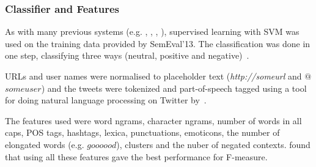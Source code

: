 \subsubsection{Classifier and Features}

As with many previous systems (e.g. \cite{article:bermingham}, \cite{chamlertwat2012discovering}, \cite{zhang2011combining}, \cite{asiaee2012if}), supervised learning with SVM was used on the training data provided by SemEval'13. The classification was done in one step, classifying three ways (neutral, positive and negative)~\citep{MohammadEA:13}.

URLs and user names were normalised to placeholder text (\textit{http://someurl} and  $@$$someuser$) and the tweets were tokenized and part-of-speech tagged using a tool for doing natural language processing on Twitter by~\cite{gimpel2010part}. 

The features used were word ngrams, character ngrams, number of words in all caps, POS tags, hashtags, lexica, punctuations, emoticons, the number of elongated words (e.g. $goooood$), clusters and the nuber of negated contexts. \cite{MohammadEA:13} found that using all these features gave the best performance for F-measure.